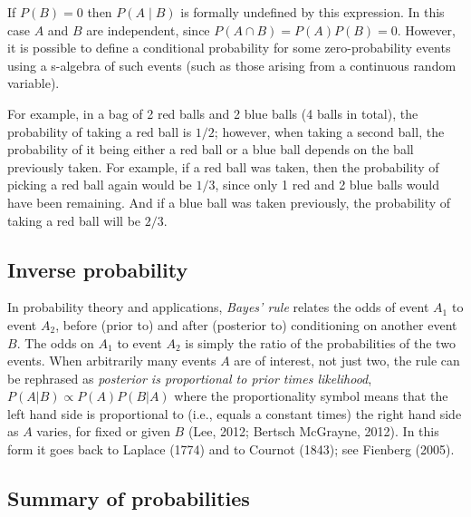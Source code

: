 If $P(B)=0$ then $P(A \mid B)$ is formally undefined by this expression. In this case $A$
and $B$ are independent, since $P(A \cap B) = P(A)P(B) = 0$. However, it is possible to
define a conditional probability for some zero-probability events using a s-algebra of
such events (such as those arising from a continuous random variable).



For example, in a bag of 2 red balls and 2 blue balls (4 balls in total), the probability
of taking a red ball is $1/2$; however, when taking a second ball, the probability of it
being either a red ball or a blue ball depends on the ball previously taken. For example,
if a red ball was taken, then the probability of picking a red ball again would be $1/3$,
since only 1 red and 2 blue balls would have been remaining. And if a blue ball was taken
previously, the probability of taking a red ball will be $2/3$.




\subsection{Inverse probability}
\label{sss:inve-aa55}




In probability theory and applications, \textit{Bayes' rule} relates the odds of event $A
_1$ to event $A _2$, before (prior to) and after (posterior to) conditioning on another
event $B$. The odds on $A _1$ to event $A _2$ is simply the ratio of the probabilities of
the two events. When arbitrarily many events $A$ are of interest, not just two, the rule
can be rephrased as \textit{posterior is proportional to prior times likelihood},
$P(A|B)\propto P(A) P(B|A)$ where the proportionality symbol means that the left hand side
is proportional to (i.e., equals a constant times) the right hand side as $A$ varies, for
fixed or given $B$ (Lee, 2012; Bertsch McGrayne, 2012). In this form it goes back to
Laplace (1774) and to Cournot (1843); see Fienberg (2005).




\subsection{Summary of probabilities}
\label{sss:summ-fc58}



